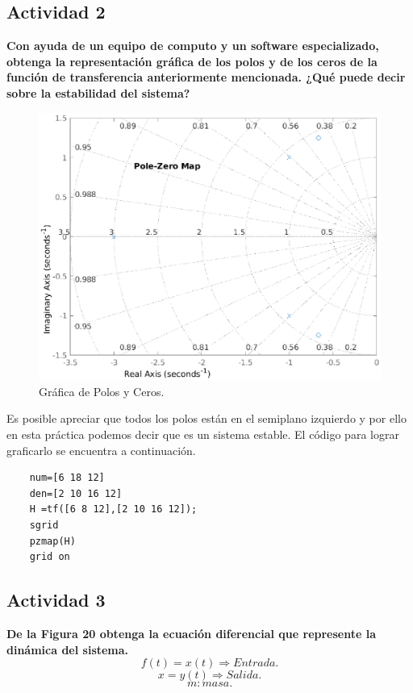 	
\subsection{Actividad 2}
\textbf{Con ayuda de un equipo de computo y un software especializado, obtenga la representación gráfica de los
polos y de los ceros de la función de transferencia anteriormente mencionada. ¿Qué puede decir sobre la
estabilidad del sistema?}

\begin{figure}[H]
	\centering
	\includegraphics[scale=0.8]{img/actividad_2}
	\caption{Gráfica de Polos y Ceros.}
	\label{fig:actividad2}
\end{figure}

Es posible apreciar que todos los polos están en el semiplano izquierdo y por ello en esta práctica podemos decir que es un sistema estable. El código para lograr graficarlo se encuentra a continuación.
\lstset{language=Matlab}
\begin{lstlisting}
	num=[6 18 12]
	den=[2 10 16 12]
	H =tf([6 8 12],[2 10 16 12]);
	sgrid
	pzmap(H)
	grid on
\end{lstlisting}


\subsection{Actividad 3}
\textbf{ De la Figura 20 obtenga la ecuación diferencial que represente la dinámica del sistema.}	
$$
f(t)=x(t){\Longrightarrow}Entrada.
$$
$$
x=y(t){\Longrightarrow}Salida.
$$
$$
m:masa.
$$



